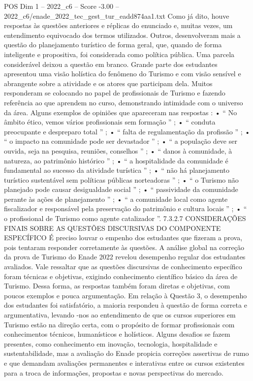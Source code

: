 \begin{textsample}{POS Dim 1 – 2022\_c6 – Score -3.00 – 2022\_c6/enade\_2022\_tec\_gest\_tur\_eadd874aa1.txt}
Como já dito, houve respostas às questões anteriores e réplicas do enunciado e, muitas vezes, um entendimento equivocado dos termos utilizados.
Outros, desenvolveram mais a questão do planejamento turístico de forma geral, que, quando de forma inteligente e propositiva, foi considerada como política pública.
Uma parcela considerável deixou a questão em branco.
Grande parte dos estudantes apresentou uma visão holística do fenômeno do Turismo e com visão sensível e abrangente sobre a atividade e os atores que participam dela.
Muitos responderam se colocando no papel de profissionais de Turismo e fazendo referência ao que aprendem no curso, demonstrando intimidade com o universo da área.
Alguns exemplos de opiniões que apareceram nas respostas : • “ No âmbito ético, vemos vários profissionais sem formação ” ; • “ conduta preocupante e despreparo total ” ; • “ falta de regulamentação da profissão ” ; • “ o impacto na comunidade pode ser devastador ” ; • “ a população deve ser ouvida, seja na pesquisa, reuniões, conselhos ” ; • “ danos à comunidade, à natureza, ao patrimônio histórico ” ; • “ a hospitalidade da comunidade é fundamental ao sucesso da atividade turística ” ; • “ não há planejamento turístico sustentável sem políticas públicas norteadoras ” ; • “ o Turismo não planejado pode causar desigualdade social ” ; • “ passividade da comunidade perante às ações de planejamento ” ; • “ a comunidade local como agente fiscalizador e responsável pela preservação do patrimônio e cultura locais ” ; • “ o profissional de Turismo como agente catalizador ”. 7.3.2.7 CONSIDERAÇÕES FINAIS SOBRE AS QUESTÕES DISCURSIVAS DO COMPONENTE ESPECÍFICO É preciso louvar o empenho dos estudantes que fizeram a prova, pois tentaram responder corretamente às questões.
A análise global na correção da prova de Turismo do Enade 2022 revelou desempenho regular dos estudantes avaliados.
Vale ressaltar que as questões discursivas de conhecimento específico foram técnicas e objetivas, exigindo conhecimento científico básico da área de Turismo.
Dessa forma, as respostas também foram diretas e objetivas, com poucos exemplos e pouca argumentação.
Em relação à Questão 3, o desempenho dos estudantes foi satisfatório, a maioria respondeu à questão de forma correta e argumentativa, levando -nos ao entendimento de que os cursos superiores em Turismo estão na direção certa, com o propósito de formar profissionais com conhecimentos técnicos, humanísticos e holísticos.
Alguns desafios se fazem presentes, como conhecimento em inovação, tecnologia, hospitalidade e sustentabilidade, mas a avaliação do Enade propicia correções assertivas de rumo e que demandam avaliações permanentes e interativas entre os cursos existentes para a troca de informações, propostas e novas perspectivas do mercado.

\end{textsample}
